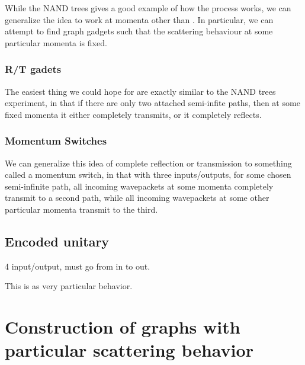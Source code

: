 \documentclass[../thesis-main/thesis-main]{subfiles}
\begin{document}
While the NAND trees gives a good example of how the process works, we can generalize the idea to work at momenta other than .  In particular, we can attempt to find graph gadgets such that the scattering behaviour at some particular momenta is fixed.


\subsubsection{R/T gadets}

The easiest thing we could hope for are exactly similar to the NAND trees experiment, in that if there are only two attached semi-infite paths, then at some fixed momenta it either completely transmits, or it completely reflects.  


\subsubsection{Momentum Switches}

We can generalize this idea of complete reflection or transmission to something called a momentum switch, in that with three inputs/outputs, for some chosen semi-infinite path, all incoming wavepackets at some momenta completely transmit to a second path, while all incoming wavepackets at some other particular momenta transmit to the third.


\subsection{Encoded unitary}


4 input/output, must go from in to out.

This is as very particular behavior.


\section{Construction of graphs with particular scattering behavior}
\end{document}

